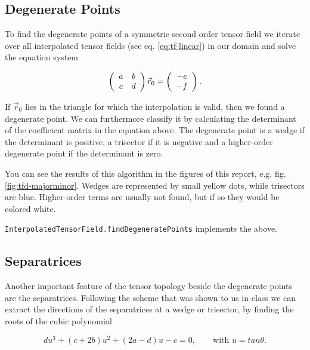 \documentclass[a4paper,10pt,notitlepage]{scrartcl}
\begin{document}
\subsection{Degenerate Points}

To find the degenerate points of a symmetric second order tensor field we
iterate over all interpolated tensor fields (see eq. \ref{eq:tf-linear}) in our
domain and solve the equation system

\begin{equation}
  \left(\begin{array}{c c}
         a & b \\
         c & d
        \end{array} \right)
 \vec{r}_0 = \left( \begin{array}{c} -e \\ -f \end{array} \right).
\end{equation}

If $\vec{r}_0$ lies in the triangle for which the interpolation is valid, then
we found a degenerate point. We can furthermore classify it by calculating the
determinant of the coefficient matrix in the equation above. The degenerate
point is a wedge if the determinant is positive, a trisector if it is negative
and a higher-order degenerate point if the determinant is zero.

You can see the results of this algorithm in the figures of this report, e.g.
fig. \ref{fig:tfd-majorminor}. Wedges are represented by small yellow dots,
while trisectors are blue. Higher-order terms are usually not found, but if so
they would be colored white.

\texttt{InterpolatedTensorField.findDegeneratePoints} implements the above.

\subsection{Separatrices}

Another important feature of the tensor topology beside the degenerate points
are the separatrices. Following the scheme that was shown to us in-class we can
extract the directions of the separatrices at a wedge or trisector, by finding
the roots of the cubic polynomial

\begin{equation}
 d u^3 + (c+2b)u^2 + (2a-d)u -c = 0, \qquad \text{with $u = tan\theta$}.
\end{equation}
\end{document}
